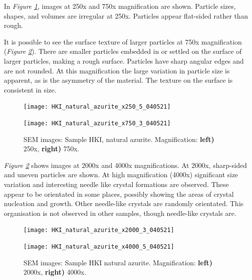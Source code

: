 In \textit{Figure \ref{fig:hki_nat_az_sem_1}}, images at 250x and 750x magnification are shown. Particle sizes, shapes, and volumes are irregular at 250x. Particles appear flat-sided rather than rough. 

It is possible to see the surface texture of larger particles at 750x magnification (\textit{Figure \ref{fig:hki_nat_az_sem_2}}). There are smaller particles embedded in or settled on the surface of larger particles, making a rough surface. Particles have sharp angular edges and are not rounded. At this magnification the large variation in particle size is apparent, as is the asymmetry of the material. The texture on the surface is consistent in size.

\begin{figure}[H]
\centering
\begin{minipage}{.45\textwidth}
  \centering
  \texttt{[image: HKI\_natural\_azurite\_x250\_5\_040521]}
\end{minipage}
\begin{minipage}{.45\textwidth}
  \centering
  \texttt{[image: HKI\_natural\_azurite\_x750\_3\_040521]}
\end{minipage}
\caption[SEM images: Sample HKI, natural azurite]{SEM images: Sample HKI, natural azurite. Magnification: \textbf{left)} 250x, \textbf{right)} 750x.}
\label{fig:hki_nat_az_sem_1}
\end{figure}

\textit{Figure \ref{fig:hki_nat_az_sem_2}} shows images at 2000x and 4000x magnifications. At 2000x, sharp-sided and uneven particles are shown. At high magnification (4000x) significant size variation and interesting needle like crystal formations are observed. These appear to be orientated in some places, possibly showing the areas of crystal nucleation and growth. Other needle-like crystals are randomly orientated. This organisation is not  observed in other samples, though needle-like crystals are.

\begin{figure}[H]
\centering
\begin{minipage}{.45\textwidth}
  \centering
  \texttt{[image: HKI\_natural\_azurite\_x2000\_3\_040521]}
\end{minipage}
\begin{minipage}{.45\textwidth}
  \centering
  \texttt{[image: HKI\_natural\_azurite\_x4000\_5\_040521]}
\end{minipage}
\caption[SEM images: Sample HKI natural azurite]{SEM images: Sample HKI natural azurite. Magnification: \textbf{left)} 2000x, \textbf{right)} 4000x.}
\label{fig:hki_nat_az_sem_2}
\end{figure}



